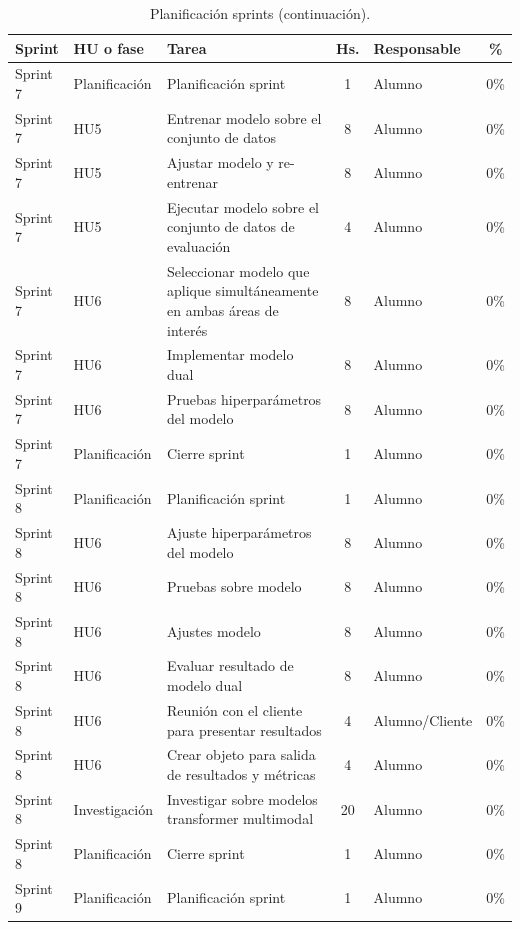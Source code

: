 \documentclass[
11pt, %
]{charter}
\begin{document}
\begin{table}[htpb]
\centering
\caption{Planificación sprints (continuación).}
\begin{tabularx}{\linewidth}{@{}|l|l|X|c|l|c|@{}}
\hline
\rowcolor[HTML]{C0C0C0}
Sprint	&	HU o fase	&	Tarea	&	Hs.	&	Responsable	&	\%	\\ \hline

Sprint 7	&	Planificación	&	Planificación sprint	&	1	&	Alumno	&	0\%	\\ \hline
Sprint 7	&	HU5	&	Entrenar modelo sobre el conjunto de datos	&	8	&	Alumno	&	0\%	\\ \hline
Sprint 7	&	HU5	&	Ajustar modelo y re-entrenar	&	8	&	Alumno	&	0\%	\\ \hline
Sprint 7	&	HU5	&	Ejecutar modelo sobre el conjunto de datos de evaluación	&	4	&	Alumno	&	0\%	\\ \hline
Sprint 7	&	HU6	&	Seleccionar modelo que aplique simultáneamente en ambas áreas de interés	&	8	&	Alumno	&	0\%	\\ \hline
Sprint 7	&	HU6	&	Implementar modelo dual 	&	8	&	Alumno	&	0\%	\\ \hline
Sprint 7	&	HU6	&	Pruebas hiperparámetros del modelo	&	8	&	Alumno	&	0\%	\\ \hline
Sprint 7	&	Planificación	&	Cierre sprint	&	1	&	Alumno	&	0\%	\\ \hline
Sprint 8	&	Planificación	&	Planificación sprint	&	1	&	Alumno	&	0\%	\\ \hline
Sprint 8	&	HU6	&	Ajuste hiperparámetros del modelo	&	8	&	Alumno	&	0\%	\\ \hline
Sprint 8	&	HU6	&	Pruebas sobre modelo	&	8	&	Alumno	&	0\%	\\ \hline
Sprint 8	&	HU6	&	Ajustes modelo	&	8	&	Alumno	&	0\%	\\ \hline
Sprint 8	&	HU6	&	Evaluar resultado de modelo dual	&	8	&	Alumno	&	0\%	\\ \hline
Sprint 8	&	HU6	&	Reunión con el cliente para presentar resultados	&	4	&	Alumno/Cliente	&	0\%	\\ \hline
Sprint 8	&	HU6	&	Crear objeto para salida de resultados y métricas	&	4	&	Alumno	&	0\%	\\ \hline
Sprint 8	&	Investigación	&	Investigar sobre modelos  transformer multimodal	&	20	&	Alumno	&	0\%	\\ \hline
Sprint 8	&	Planificación	&	Cierre sprint	&	1	&	Alumno	&	0\%	\\ \hline
Sprint 9	&	Planificación	&	Planificación sprint	&	1	&	Alumno	&	0\%	\\ \hline

\end{tabularx}
\end{table}
\end{document}
